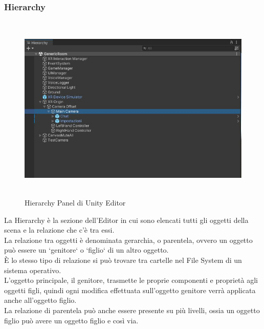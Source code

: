 \subsubsection{Hierarchy}
\begin{figure}[H]
    \centering
    \includegraphics[width=12cm, height=9cm]{Immagini/Hierarchy.jpg}
    \caption{Hierarchy Panel di Unity Editor}
    \label{fig:my_label}
\end{figure}
La Hierarchy\cite{unityhierarchy} è la sezione dell'Editor in cui sono elencati tutti gli oggetti della scena e la relazione che c'è tra essi.\\La relazione tra oggetti è denominata gerarchia, o parentela, ovvero un oggetto può essere un `genitore` o `figlio` di un altro oggetto.\\È lo stesso tipo di relazione si può trovare tra cartelle nel \gls{File System} di un sistema operativo.\\L'oggetto principale, il genitore, trasmette le proprie componenti e proprietà agli oggetti figli, quindi ogni modifica effettuata sull'oggetto genitore verrà applicata anche all'oggetto figlio.\\La relazione di parentela può anche essere presente su più livelli, ossia un oggetto figlio può avere un oggetto figlio e così via.
